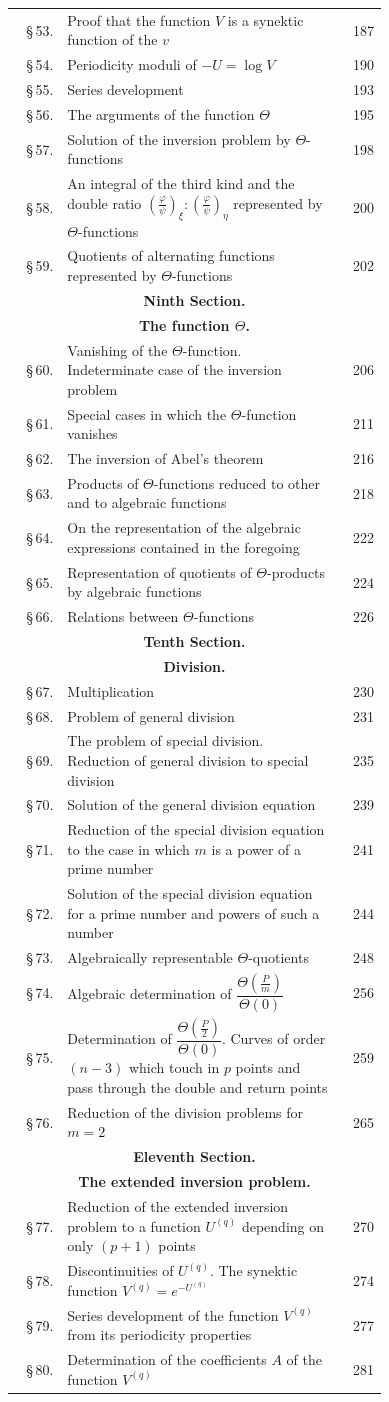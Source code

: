 \documentclass[10pt]{article}
\newcommand{\tocentry}[3]{\S\,#1 & #2 & #3\\}
\newcommand{\tocsec}[2]{\multicolumn{3}{c}{\bfseries #1}\\[-0.15em]\multicolumn{3}{c}{\bfseries #2}\\[0.25em]}
\begin{document}
{\begin{longtable}{@{}r@{\ }p{0.74\linewidth}@{\ }r@{}}
\tocentry{53.}{Proof that the function $V$ is a synektic function of the $v$}{187}
\tocentry{54.}{Periodicity moduli of $-U=\log V$}{190}
\tocentry{55.}{Series development}{193}
\tocentry{56.}{The arguments of the function $\Theta$}{195}
\tocentry{57.}{Solution of the inversion problem by $\Theta$-functions}{198}
\tocentry{58.}{An integral of the third kind and the double ratio $\left(\frac{\varphi}{\psi}\right)_{\xi}:\left(\frac{\varphi}{\psi}\right)_{\eta}$ represented by $\Theta$-functions}{200}
\tocentry{59.}{Quotients of alternating functions represented by $\Theta$-functions}{202}
\tocsec{Ninth Section.}{The function $\Theta$.}
\tocentry{60.}{Vanishing of the $\Theta$-function. Indeterminate case of the inversion problem}{206}
\tocentry{61.}{Special cases in which the $\Theta$-function vanishes}{211}
\tocentry{62.}{The inversion of Abel's theorem}{216}
\tocentry{63.}{Products of $\Theta$-functions reduced to other and to algebraic functions}{218}
\tocentry{64.}{On the representation of the algebraic expressions contained in the foregoing}{222}
\tocentry{65.}{Representation of quotients of $\Theta$-products by algebraic functions}{224}
\tocentry{66.}{Relations between $\Theta$-functions}{226}
\tocsec{Tenth Section.}{Division.}
\tocentry{67.}{Multiplication}{230}
\tocentry{68.}{Problem of general division}{231}
\tocentry{69.}{The problem of special division. Reduction of general division to special division}{235}
\tocentry{70.}{Solution of the general division equation}{239}
\tocentry{71.}{Reduction of the special division equation to the case in which $m$ is a power of a prime number}{241}
\tocentry{72.}{Solution of the special division equation for a prime number and powers of such a number}{244}
\tocentry{73.}{Algebraically representable $\Theta$-quotients}{248}
\tocentry{74.}{Algebraic determination of $\dfrac{\Theta\left(\frac{P}{m}\right)}{\Theta(0)}$}{256}
\tocentry{75.}{Determination of $\dfrac{\Theta\left(\frac{P}{2}\right)}{\Theta(0)}$. Curves of order $(n-3)$ which touch in $p$ points and pass through the double and return points}{259}
\tocentry{76.}{Reduction of the division problems for $m=2$}{265}
\tocsec{Eleventh Section.}{The extended inversion problem.}
\tocentry{77.}{Reduction of the extended inversion problem to a function $U^{(q)}$ depending on only $(p+1)$ points}{270}
\tocentry{78.}{Discontinuities of $U^{(q)}$. The synektic function $V^{(q)}=e^{-U^{(q)}}$}{274}
\tocentry{79.}{Series development of the function $V^{(q)}$ from its periodicity properties}{277}
\tocentry{80.}{Determination of the coefficients $A$ of the function $V^{(q)}$}{281}

\end{longtable}}
\end{document}
